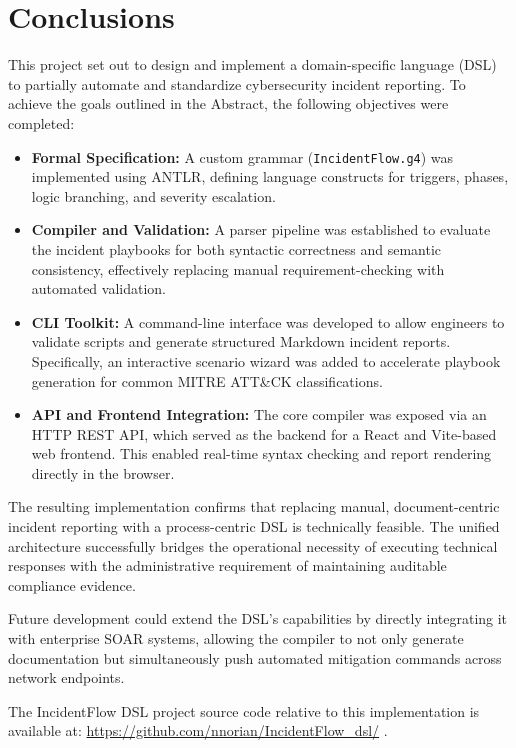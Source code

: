 \chapter*{Conclusions}
{}

This project set out to design and implement a domain-specific language (DSL) to partially automate and standardize cybersecurity incident reporting. To achieve the goals outlined in the Abstract, the following objectives were completed:

\begin{itemize}
    \item \textbf{Formal Specification:} A custom grammar (\texttt{IncidentFlow.g4}) was implemented using ANTLR, defining language constructs for triggers, phases, logic branching, and severity escalation.
    \item \textbf{Compiler and Validation:} A parser pipeline was established to evaluate the incident playbooks for both syntactic correctness and semantic consistency, effectively replacing manual requirement-checking with automated validation.
    \item \textbf{CLI Toolkit:} A command-line interface was developed to allow engineers to validate scripts and generate structured Markdown incident reports. Specifically, an interactive scenario wizard was added to accelerate playbook generation for common MITRE ATT\&CK classifications.
    \item \textbf{API and Frontend Integration:} The core compiler was exposed via an HTTP REST API, which served as the backend for a React and Vite-based web frontend. This enabled real-time syntax checking and report rendering directly in the browser.
\end{itemize}

The resulting implementation confirms that replacing manual, document-centric incident reporting with a process-centric DSL is technically feasible. The unified architecture successfully bridges the operational necessity of executing technical responses with the administrative requirement of maintaining auditable compliance evidence. 

Future development could extend the DSL's capabilities by directly integrating it with enterprise SOAR systems, allowing the compiler to not only generate documentation but simultaneously push automated mitigation commands across network endpoints.

The IncidentFlow DSL project source code relative to this implementation is available at: \url{https://github.com/nnorian/IncidentFlow_dsl/} \autocite{report2026}.

